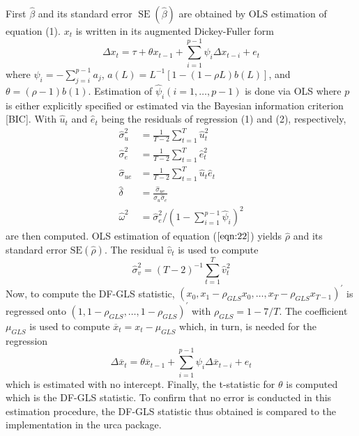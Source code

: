 \documentclass{article}
\begin{document}
First $\hat{\beta}$ and its standard error $\operatorname{SE}(\widehat{\beta})$ are obtained by OLS estimation of equation (1). $x_{t}$ is written in its augmented Dickey-Fuller form
\begin{equation}
\Delta x_{t}=\tau+\theta x_{t-1}+\sum_{i=1}^{p-1} \psi_{i} \Delta x_{t-i}+e_{t}
\end{equation}
where $\psi_{i}=-\sum_{j=i}^{p-1} a_{j}$, $a(L)=L^{-1}[1-(1-\rho L) b(L)]$, and $\theta=(\rho-1) b(1)$. Estimation of $\widehat{\psi}_{i}(i=1, \ldots, p-1)$ is done via OLS where $p$ is either explicitly specified or estimated via the Bayesian information criterion [BIC].
With $\widehat{u}_{t}$ and $\widehat{e}_{t}$ being the residuals of regression (1) and (2), respectively,
\begin{align} \widehat{\sigma}_{u}^{2} &=\frac{1}{T-2} \sum_{t=1}^{T} \widehat{u}_{t}^{2} \\ \widehat{\sigma}_{e}^{2} &=\frac{1}{T-2} \sum_{t=1}^{T} \widehat{e}_{t}^{2} \\ \widehat{\sigma}_{u e} &=\frac{1}{T-2} \sum_{t=1}^{T} \widehat{u}_{t} \widehat{e}_{t} \\ \widehat{\delta} &=\frac{\widehat{\sigma}_{u e}}{\widehat{\sigma}_{u} \widehat{\sigma}_{e}} \\ \widehat{\omega}^{2}&=\widehat{\sigma}_{e}^{2} /\left(1-\sum_{i=1}^{p-1} \widehat{\psi}_{i}\right)^{2}
\end{align}
are then computed. OLS estimation of equation ($\ref{eqn:22}$) yields $\widehat{\rho}$ and its standard error $\mathrm{SE}(\widehat{\rho})$. The residual $\widehat{v}_{t}$ is used to compute 
\begin{equation}
\widehat{\sigma}_{v}^{2}=(T-2)^{-1} \sum_{t=1}^{T} \widehat{v}_{t}^{2}
\end{equation} 
Now, to compute the DF-GLS statistic, $\left(x_{0}, x_{1}-\rho_{G L S} x_{0}, \ldots, x_{T}-\rho_{G L S} x_{T-1}\right)^{\prime}$ is regressed onto 
$\left(1,1-\rho_{G L S}, \ldots, 1-\rho_{G L S}\right)^{\prime}$ with $\rho_{G L S}=1-7 / T$. The coefficient $\mu_{G L S}$ is used to compute $\overline{x}_{t}=x_{t}-\mu_{G L S}$ which, in turn, is needed for the regression 
\begin{equation}
\Delta \overline{x}_{t}=\theta \overline{x}_{t-1}+\sum_{i=1}^{p-1} \psi_{i} \Delta \overline{x}_{t-i}+e_{t}
\end{equation} which is estimated with no intercept. Finally, the t-statistic for $\theta$ is computed which is the DF-GLS statistic. To confirm that no error is conducted in this estimation procedure, the DF-GLS statistic thus obtained is compared to the implementation in the urca package. 
\end{document}
